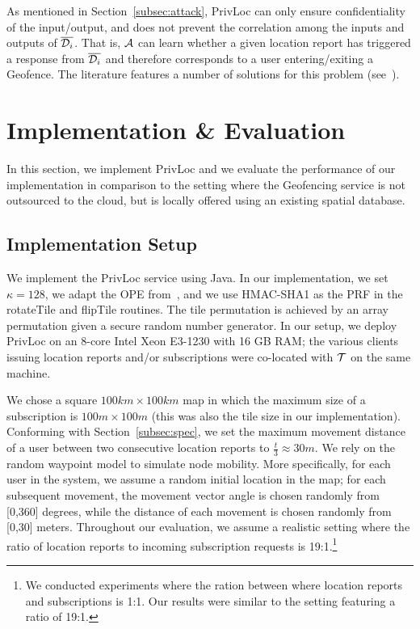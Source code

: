 \documentclass{llncs}
\newcommand\SECPAR{\kappa}
\newcommand\sol{{\sf PrivLoc}}
\begin{document}
As mentioned in Section~\ref{subsec:attack}, \sol{} can only ensure confidentiality of the input/output, and does not prevent the correlation among
the inputs and outputs of $\overline{{\cal D}_i}$. That is, $\cal A$ can learn whether a given location report has triggered a response from $\overline{{\cal D}_i}$ and therefore corresponds
to a user entering/exiting a Geofence. The literature features a number of solutions for this problem (see~\cite{Guha:2012:KLP:2228298.2228317,Sweeney:2002:AKA:774544.774553,Sweeney:2002:KAM:774544.774552,Kido05ananonymous}).

\section{Implementation \& Evaluation}\label{sec:implementation}

In this section, we implement \sol{} and we evaluate the performance of our implementation in comparison to the setting where the Geofencing service is not outsourced to the cloud, but is locally offered using an existing spatial database.
\vspace{-0.5 em}
\subsection{Implementation Setup}

We implement the \sol{} service using Java. In our implementation, we set $\SECPAR=128$, we adapt the OPE from~\cite{Boldyreva:2009:OSE:1533674.1533691}, and
we use HMAC-SHA1 as the PRF in the {\sf rotateTile} and {\sf flipTile} routines. The tile permutation is achieved
by an array permutation given a secure random number generator. In our setup, we deploy \sol{} on an 8-core Intel Xeon E3-1230 with 16 GB RAM; the various clients issuing location reports and/or subscriptions were co-located with $\cal T$ on the same machine.

We chose a square $100km \times 100km$ map in which the maximum size of a subscription is $100m \times 100m$ (this was also the tile size in
our implementation). Conforming with Section~\ref{subsec:spec}, we set the maximum
 movement distance of a user between two consecutive location reports to $\frac{t}{3}\approx 30m$. We rely on the random waypoint model to simulate node mobility. More specifically, for each user in the system, we assume a random initial location
 in the map; for each subsequent movement, the movement vector angle is chosen randomly from [0,360] degrees, while the distance of each movement is chosen randomly from [0,30] meters. Throughout our evaluation, we assume a realistic setting where
 the ratio of location reports to incoming subscription requests is 19:1.\footnote{We conducted experiments where the ration between where location reports and subscriptions is 1:1. Our results were similar to the setting featuring a ratio of 19:1.}
\end{document}
